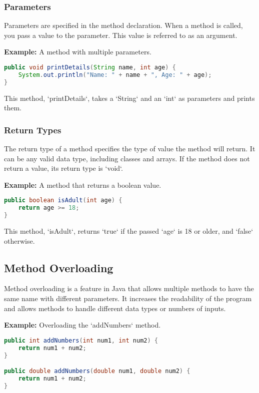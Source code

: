 \documentclass{article}
\begin{document}
\subsubsection{Parameters}
Parameters are specified in the method declaration. When a method is called, you pass a value to the parameter. This value is referred to as an argument.

\textbf{Example:} A method with multiple parameters.

\begin{lstlisting}[language=Java]
public void printDetails(String name, int age) {
    System.out.println("Name: " + name + ", Age: " + age);
}
\end{lstlisting}

This method, `printDetails`, takes a `String` and an `int` as parameters and prints them.

\subsubsection{Return Types}
The return type of a method specifies the type of value the method will return. It can be any valid data type, including classes and arrays. If the method does not return a value, its return type is `void`.

\textbf{Example:} A method that returns a boolean value.

\begin{lstlisting}[language=Java]
public boolean isAdult(int age) {
    return age >= 18;
}
\end{lstlisting}

This method, `isAdult`, returns `true` if the passed `age` is 18 or older, and `false` otherwise.



\subsection{Method Overloading}
Method overloading is a feature in Java that allows multiple methods to have the same name with different parameters. It increases the readability of the program and allows methods to handle different data types or numbers of inputs.

\textbf{Example:} Overloading the `addNumbers` method.

\begin{lstlisting}[language=Java]
public int addNumbers(int num1, int num2) {
    return num1 + num2;
}

public double addNumbers(double num1, double num2) {
    return num1 + num2;
}
\end{lstlisting}
\end{document}
